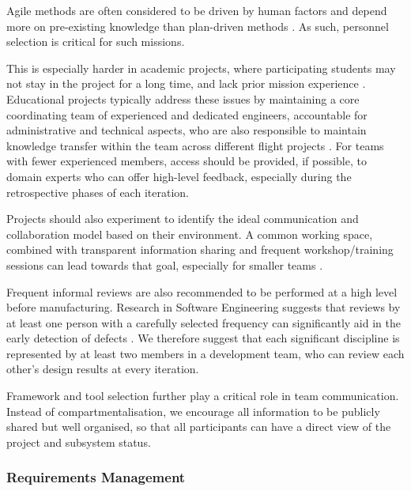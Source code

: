 \documentclass[journal,10pt]{IEEEtran}
\begin{document}
Agile methods are often considered to be driven by human factors and depend more on pre-existing knowledge than plan-driven methods \mbox{\autocite[ch.~2]{boehmBalancingAgilityDiscipline2004}}.
As such, personnel selection is critical for such missions.
	
This is especially harder in academic projects, where participating students may not stay in the project for a long time, and lack prior mission experience {\mbox{\autocite{honore-livermoreIntegratingAgileSystems2022}}}.
	Educational projects typically address these issues by maintaining a core coordinating team of experienced and dedicated engineers, accountable for administrative and technical aspects, who are also responsible to maintain knowledge transfer within the team across different flight projects {\autocite{berthoudUniversityCubeSatProject2019}}. For teams with fewer experienced members, access should be provided, if possible, to domain experts who can offer high-level feedback, especially during the retrospective phases of each iteration.

Projects should also experiment to identify the ideal communication and collaboration model based on their environment. A common working space, combined with transparent information sharing and frequent workshop/training sessions can lead towards that goal, especially for smaller teams {\autocite{honore-livermoreCubeSatsUniversityUsing2019}}.%

Frequent informal reviews are also recommended to be performed at a high level before manufacturing.
	Research in Software Engineering suggests that reviews by at least one person with a carefully selected frequency can significantly aid in the early detection of defects \autocite{kemererImpactDesignCode2009}.
	We therefore suggest that each significant discipline is represented by at least two members in a development team, who can review each other's design results at every iteration.%

Framework and tool selection further play a critical role in team communication. Instead of compartmentalisation, we encourage all information to be publicly shared but well organised, so that all participants can have a direct view of the project and subsystem status.

\subsubsection{Requirements Management}
\label{sec:methodology_requirements}
\end{document}

